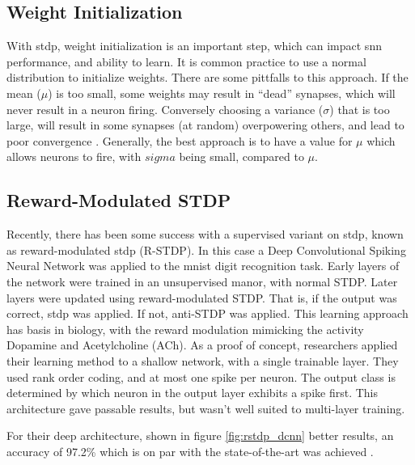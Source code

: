     \subsection{Weight Initialization}
    
    With \Gls{stdp}, weight initialization is an important step, which can
    impact \Gls{snn} performance, and ability to learn. It is common practice to
    use a normal distribution to initialize weights. There are some pittfalls to
    this approach. If the mean ($\mu$) is too small, some weights may result in
    ``dead'' synapses, which will never result in a neuron firing. Conversely
    choosing a variance ($\sigma$) that is too large, will result in some
    synapses (at random) overpowering others, and lead to poor convergence
    \cite{vigneron_2020}. Generally, the best approach is to have a value for
    $\mu$ which allows neurons to fire, with $sigma$ being small, compared to
    $\mu$.

    \subsection{Reward-Modulated STDP}
    
    Recently, there has been some success with a supervised variant on \Gls{stdp},
    known as reward-modulated \Gls{stdp} (R-STDP). In this case a Deep Convolutional
    Spiking Neural Network was applied to the \Gls{mnist} digit recognition
    task. Early layers of the network were trained in an unsupervised manor,
    with normal STDP. Later layers were updated using reward-modulated
    STDP. That is, if the output was correct, \Gls{stdp} was applied. If not,
    anti-STDP was applied. This learning approach has basis in biology, with the
    reward modulation mimicking the activity Dopamine and Acetylcholine
    (ACh). As a proof of concept, researchers applied their learning method to a
    shallow network, with a single trainable layer. They used rank order coding,
    and at most one spike per neuron. The output class is determined by which
    neuron in the output layer exhibits a spike first. This architecture gave
    passable results, but wasn't well suited to multi-layer training.
    
    For their deep architecture, shown in figure \ref{fig:rstdp_dcnn} better
    results, an accuracy of 97.2\% which is on par with the state-of-the-art was
    achieved \cite{mozafari_2018}.
    

